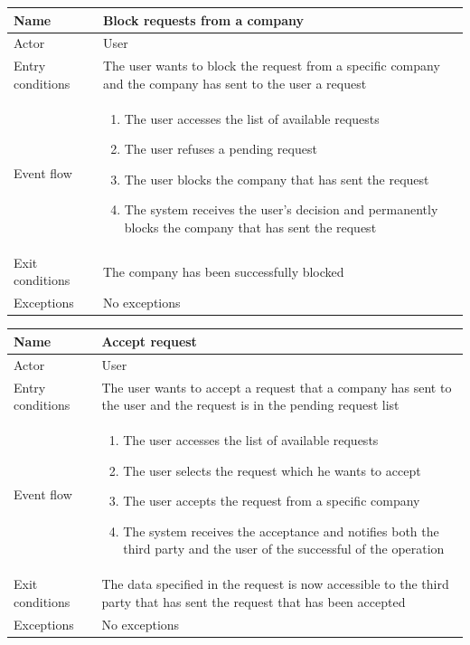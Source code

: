 \begin{table}[H]
\begin{tabularx}{\textwidth}{|l|X|}
\hline
 Name & Block requests from a company \\ \hline
 Actor & User \\ \hline
 Entry conditions & The user wants to block the request from a specific company and the company has sent to the user a request \\ \hline
 Event flow & 
 \begin{enumerate}
 	\item The user accesses the list of available requests
  	\item The user refuses a pending request 
 	\item The user blocks the company that has sent the request
 	\item The system receives the user's decision and permanently blocks the company that has sent the request
 \end{enumerate}   \\ \hline
 Exit conditions & The company has been successfully blocked \\ \hline
 Exceptions &  No exceptions
 \\ \hline
\end{tabularx}
\end{table}


\begin{table}[H]
\begin{tabularx}{\textwidth}{|l|X|}
\hline
 Name & Accept request\\ \hline
 Actor & User \\ \hline
 Entry conditions & The user wants to accept a request that a company has sent to the user and the request is in the pending request list \\ \hline
 Event flow & 
 \begin{enumerate}
 	\item The user accesses the list of available requests
  	\item The user selects the request which he wants to accept
 	\item The user accepts the request from a specific company
 	\item The system receives the acceptance and notifies both the third party and the user of the successful of the operation
 \end{enumerate}   \\ \hline
 Exit conditions & The data specified in the request is now accessible to the third party that has sent the request that has been accepted\\ \hline
 Exceptions & No exceptions
 \\ \hline
\end{tabularx}
\end{table}


